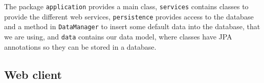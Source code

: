 \documentclass{tk3-team}
\begin{document}
The package \texttt{application} provides a main class, \texttt{services} contains classes to provide the different web services, \texttt{persistence} provides access to the database and a method in \texttt{DataManager} to insert some default data into the database, that we are using, and \texttt{data} contains our data model, where classes have JPA annotations so they can be stored in a database.


\subsection{Web client}
\end{document}
